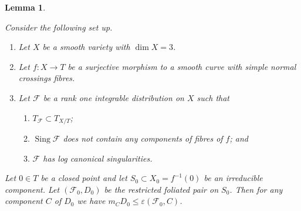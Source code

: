 \documentclass[12pt, a4paper]{amsart}
\DeclareMathOperator{\sing}{Sing}
\newtheorem{lemma}[theorem]{Lemma}
\theoremstyle{definition}
\theoremstyle{named}
\begin{document}
\begin{lemma}
	\label{lem_sing_adjunction_families}

Consider the following set up.
\begin{enumerate}
    \item Let $X$ be a smooth variety with $\dim X = 3$. 
    \item Let $f\colon X \to T$ be a surjective morphism to a smooth curve with simple normal crossings fibres.
    \item Let $\mathcal F$ be a rank one integrable distribution on $X$ such that
    \begin{enumerate} 
    \item $T_{\mathcal F} \subset T_{X/T}$; 
    \item $\sing \mathcal F$ does not 
contain any components of fibres of $f$; and
\item  $\mathcal F$ has log canonical singularities.
\end{enumerate}
\end{enumerate}

	Let $0 \in T$ be a closed point
	and let $S_0 \subset X_0 = f^{-1}(0)$ be an irreducible component. 
	Let $(\mathcal F_0, D_0)$ be the restricted foliated pair on $S_0$. 
Then for any component $C$ of $D_0$ we have $m_CD_0 \leq \varepsilon(\mathcal F_0, C)$.
\end{lemma}
\end{document}
